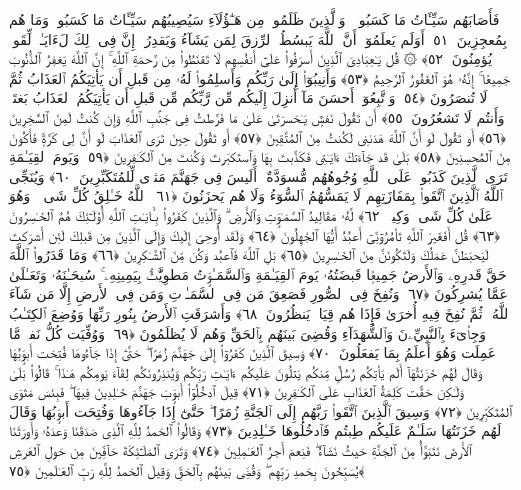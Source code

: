  فَأَصَابَهُم سَيِّـَٔاتُ مَا كَسَبُوا۟ ۚ وَٱلَّذِينَ ظَلَمُوا۟ مِن هَـٰٓؤُلَآءِ سَيُصِيبُهُم سَيِّـَٔاتُ مَا كَسَبُوا۟ وَمَا هُم بِمُعجِزِينَ ﴿٥١﴾
 أَوَلَم يَعلَمُوٓا۟ أَنَّ ٱللَّهَ يَبسُطُ ٱلرِّزقَ لِمَن يَشَآءُ وَيَقدِرُ ۚ إِنَّ فِى ذَٟلِكَ لَءَايَـٰتٍۢ لِّقَومٍۢ يُؤمِنُونَ ﴿٥٢﴾
 ۞ قُل يَـٰعِبَادِىَ ٱلَّذِينَ أَسرَفُوا۟ عَلَىٰٓ أَنفُسِهِم لَا تَقنَطُوا۟ مِن رَّحمَةِ ٱللَّهِ ۚ إِنَّ ٱللَّهَ يَغفِرُ ٱلذُّنُوبَ جَمِيعًا ۚ إِنَّهُۥ هُوَ ٱلغَفُورُ ٱلرَّحِيمُ ﴿٥٣﴾
 وَأَنِيبُوٓا۟ إِلَىٰ رَبِّكُم وَأَسلِمُوا۟ لَهُۥ مِن قَبلِ أَن يَأتِيَكُمُ ٱلعَذَابُ ثُمَّ لَا تُنصَرُونَ ﴿٥٤﴾
 وَٱتَّبِعُوٓا۟ أَحسَنَ مَآ أُنزِلَ إِلَيكُم مِّن رَّبِّكُم مِّن قَبلِ أَن يَأتِيَكُمُ ٱلعَذَابُ بَغتَةًۭ وَأَنتُم لَا تَشعُرُونَ ﴿٥٥﴾
 أَن تَقُولَ نَفسٌۭ يَـٰحَسرَتَىٰ عَلَىٰ مَا فَرَّطتُ فِى جَنۢبِ ٱللَّهِ وَإِن كُنتُ لَمِنَ ٱلسَّٰخِرِينَ ﴿٥٦﴾
 أَو تَقُولَ لَو أَنَّ ٱللَّهَ هَدَىٰنِى لَكُنتُ مِنَ ٱلمُتَّقِينَ ﴿٥٧﴾
 أَو تَقُولَ حِينَ تَرَى ٱلعَذَابَ لَو أَنَّ لِى كَرَّةًۭ فَأَكُونَ مِنَ ٱلمُحسِنِينَ ﴿٥٨﴾
 بَلَىٰ قَد جَآءَتكَ ءَايَـٰتِى فَكَذَّبتَ بِهَا وَٱستَكبَرتَ وَكُنتَ مِنَ ٱلكَـٰفِرِينَ ﴿٥٩﴾
 وَيَومَ ٱلقِيَـٰمَةِ تَرَى ٱلَّذِينَ كَذَبُوا۟ عَلَى ٱللَّهِ وُجُوهُهُم مُّسوَدَّةٌ ۚ أَلَيسَ فِى جَهَنَّمَ مَثوًۭى لِّلمُتَكَبِّرِينَ ﴿٦٠﴾
 وَيُنَجِّى ٱللَّهُ ٱلَّذِينَ ٱتَّقَوا۟ بِمَفَازَتِهِم لَا يَمَسُّهُمُ ٱلسُّوٓءُ وَلَا هُم يَحزَنُونَ ﴿٦١﴾
 ٱللَّهُ خَـٰلِقُ كُلِّ شَىءٍۢ ۖ وَهُوَ عَلَىٰ كُلِّ شَىءٍۢ وَكِيلٌۭ ﴿٦٢﴾
 لَّهُۥ مَقَالِيدُ ٱلسَّمَـٰوَٟتِ وَٱلأَرضِ ۗ وَٱلَّذِينَ كَفَرُوا۟ بِـَٔايَـٰتِ ٱللَّهِ أُو۟لَـٰٓئِكَ هُمُ ٱلخَـٰسِرُونَ ﴿٦٣﴾
 قُل أَفَغَيرَ ٱللَّهِ تَأمُرُوٓنِّىٓ أَعبُدُ أَيُّهَا ٱلجَٰهِلُونَ ﴿٦٤﴾
 وَلَقَد أُوحِىَ إِلَيكَ وَإِلَى ٱلَّذِينَ مِن قَبلِكَ لَئِن أَشرَكتَ لَيَحبَطَنَّ عَمَلُكَ وَلَتَكُونَنَّ مِنَ ٱلخَـٰسِرِينَ ﴿٦٥﴾
 بَلِ ٱللَّهَ فَٱعبُد وَكُن مِّنَ ٱلشَّـٰكِرِينَ ﴿٦٦﴾
 وَمَا قَدَرُوا۟ ٱللَّهَ حَقَّ قَدرِهِۦ وَٱلأَرضُ جَمِيعًۭا قَبضَتُهُۥ يَومَ ٱلقِيَـٰمَةِ وَٱلسَّمَـٰوَٟتُ مَطوِيَّٰتٌۢ بِيَمِينِهِۦ ۚ سُبحَـٰنَهُۥ وَتَعَـٰلَىٰ عَمَّا يُشرِكُونَ ﴿٦٧﴾
 وَنُفِخَ فِى ٱلصُّورِ فَصَعِقَ مَن فِى ٱلسَّمَـٰوَٟتِ وَمَن فِى ٱلأَرضِ إِلَّا مَن شَآءَ ٱللَّهُ ۖ ثُمَّ نُفِخَ فِيهِ أُخرَىٰ فَإِذَا هُم قِيَامٌۭ يَنظُرُونَ ﴿٦٨﴾
 وَأَشرَقَتِ ٱلأَرضُ بِنُورِ رَبِّهَا وَوُضِعَ ٱلكِتَـٰبُ وَجِا۟ىٓءَ بِٱلنَّبِيِّۦنَ وَٱلشُّهَدَآءِ وَقُضِىَ بَينَهُم بِٱلحَقِّ وَهُم لَا يُظلَمُونَ ﴿٦٩﴾
 وَوُفِّيَت كُلُّ نَفسٍۢ مَّا عَمِلَت وَهُوَ أَعلَمُ بِمَا يَفعَلُونَ ﴿٧٠﴾
 وَسِيقَ ٱلَّذِينَ كَفَرُوٓا۟ إِلَىٰ جَهَنَّمَ زُمَرًا ۖ حَتَّىٰٓ إِذَا جَآءُوهَا فُتِحَت أَبوَٟبُهَا وَقَالَ لَهُم خَزَنَتُهَآ أَلَم يَأتِكُم رُسُلٌۭ مِّنكُم يَتلُونَ عَلَيكُم ءَايَـٰتِ رَبِّكُم وَيُنذِرُونَكُم لِقَآءَ يَومِكُم هَـٰذَا ۚ قَالُوا۟ بَلَىٰ وَلَـٰكِن حَقَّت كَلِمَةُ ٱلعَذَابِ عَلَى ٱلكَـٰفِرِينَ ﴿٧١﴾
 قِيلَ ٱدخُلُوٓا۟ أَبوَٟبَ جَهَنَّمَ خَـٰلِدِينَ فِيهَا ۖ فَبِئسَ مَثوَى ٱلمُتَكَبِّرِينَ ﴿٧٢﴾
 وَسِيقَ ٱلَّذِينَ ٱتَّقَوا۟ رَبَّهُم إِلَى ٱلجَنَّةِ زُمَرًا ۖ حَتَّىٰٓ إِذَا جَآءُوهَا وَفُتِحَت أَبوَٟبُهَا وَقَالَ لَهُم خَزَنَتُهَا سَلَـٰمٌ عَلَيكُم طِبتُم فَٱدخُلُوهَا خَـٰلِدِينَ ﴿٧٣﴾
 وَقَالُوا۟ ٱلحَمدُ لِلَّهِ ٱلَّذِى صَدَقَنَا وَعدَهُۥ وَأَورَثَنَا ٱلأَرضَ نَتَبَوَّأُ مِنَ ٱلجَنَّةِ حَيثُ نَشَآءُ ۖ فَنِعمَ أَجرُ ٱلعَـٰمِلِينَ ﴿٧٤﴾
 وَتَرَى ٱلمَلَـٰٓئِكَةَ حَآفِّينَ مِن حَولِ ٱلعَرشِ يُسَبِّحُونَ بِحَمدِ رَبِّهِم ۖ وَقُضِىَ بَينَهُم بِٱلحَقِّ وَقِيلَ ٱلحَمدُ لِلَّهِ رَبِّ ٱلعَـٰلَمِينَ ﴿٧٥﴾
 
